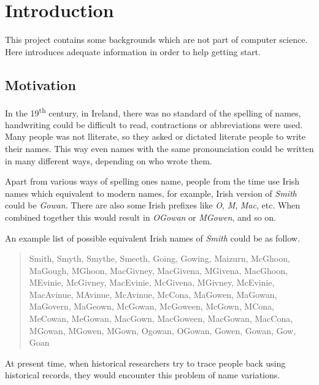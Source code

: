 \chapter{Introduction}
\label{ch:introduction}

This project contains some backgrounds which are not part of computer science.
Here introduces adequate information in order to help getting start.

\section{Motivation}

In the 19\textsuperscript{th} century, in Ireland, there was no standard
of the spelling of names, handwriting could be difficult to read,
contractions or abbreviations were used. Many people was not lliterate,
so they asked or dictated literate people to write their names.
This way even names with the same pronounciation could be written
in many different ways, depending on who wrote them.

Apart from various ways of spelling one\textquotesingle s name,
people from the time use Irish names which equivalent to modern names,
for example, Irish version of \emph{Smith} could be \emph{Gowan}.
There are also some Irish prefixes like \emph{O\textquotesingle}, \emph{M\textquotesingle}, \emph{Mac},
etc. When combined together this would result in \emph{O\textquotesingle Gowan} or
\emph{M\textquotesingle Gowen}, and so on.

An example list of possible equivalent Irish names of \emph{Smith}
could be as follow.

\begin{quotation} \noindent
Smith, Smyth, Smythe, Smeeth, Going, Gowing, Maizurn, McGhoon, MaGough,
M\textquotesingle Ghoon, MacGivney, MacGivena, M\textquotesingle Givena,
MacGhoon, M\textquotesingle Evinie, McGivney, MacEvinie, McGivena,
M\textquotesingle Givney, McEvinie, MacAvinue, M\textquotesingle Avinue,
McAvinue, McCona, MaGowen, MaGowan, MaGovern, MaGeown, McGowan, McGoween,
McGown, M\textquotesingle Cona, MeCowan, MeGowan, MacGown, MacGoween,
MacGowan, MacCona, M\textquotesingle Gowan, M\textquotesingle Gowen,
M\textquotesingle Gown, Ogowan, O\textquotesingle Gowan, Gowen,
Gowan, Gow, Goan
\end{quotation}

At present time, when historical researchers try to trace people back
using historical records, they would encounter this problem of
name variations.

